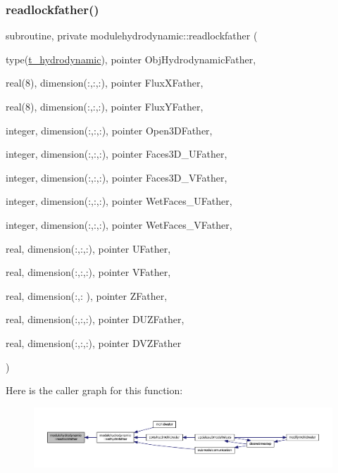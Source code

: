 \subsubsection{\texorpdfstring{readlockfather()}{readlockfather()}}
{\footnotesize\ttfamily subroutine, private modulehydrodynamic\+::readlockfather (\begin{DoxyParamCaption}\item[{type(\mbox{\hyperlink{structmodulehydrodynamic_1_1t__hydrodynamic}{t\+\_\+hydrodynamic}}), pointer}]{Obj\+Hydrodynamic\+Father,  }\item[{real(8), dimension(\+:,\+:,\+:), pointer}]{Flux\+X\+Father,  }\item[{real(8), dimension(\+:,\+:,\+:), pointer}]{Flux\+Y\+Father,  }\item[{integer, dimension(\+:,\+:,\+:), pointer}]{Open3\+D\+Father,  }\item[{integer, dimension(\+:,\+:,\+:), pointer}]{Faces3\+D\+\_\+\+U\+Father,  }\item[{integer, dimension(\+:,\+:,\+:), pointer}]{Faces3\+D\+\_\+\+V\+Father,  }\item[{integer, dimension(\+:,\+:,\+:), pointer}]{Wet\+Faces\+\_\+\+U\+Father,  }\item[{integer, dimension(\+:,\+:,\+:), pointer}]{Wet\+Faces\+\_\+\+V\+Father,  }\item[{real, dimension(\+:,\+:,\+:), pointer}]{U\+Father,  }\item[{real, dimension(\+:,\+:,\+:), pointer}]{V\+Father,  }\item[{real, dimension(\+:,\+:  ), pointer}]{Z\+Father,  }\item[{real, dimension(\+:,\+:,\+:), pointer}]{D\+U\+Z\+Father,  }\item[{real, dimension(\+:,\+:,\+:), pointer}]{D\+V\+Z\+Father }\end{DoxyParamCaption})\hspace{0.3cm}{\ttfamily [private]}}

Here is the caller graph for this function\+:\nopagebreak
\begin{figure}[H]
\begin{center}
\leavevmode
\includegraphics[width=350pt]{namespacemodulehydrodynamic_afdbd6a69d8a99bcbad6b5c090639bc1b_icgraph}
\end{center}
\end{figure}
\mbox{\label{namespacemodulehydrodynamic_ad125ca32b530446bb6be8cbf582f792e}} 
